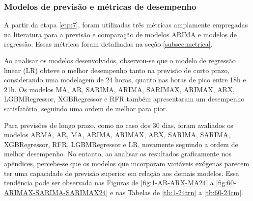 \subsubsection{Modelos de previs\~ao e m\'etricas de desempenho}\label{subsubsec:modelos}

A partir da etapa \ref{etp:7}, foram utilizadas três métricas amplamente empregadas na literatura para a previsão e comparação de modelos ARIMA e modelos de regressão. Essas métricas foram detalhadas na seção \ref{subsec:metrica}.

Ao analisar os modelos desenvolvidos, observou-se que o modelo de regressão linear (LR) obteve o melhor desempenho tanto na previsão de curto prazo, considerando uma modelagem de 24 horas, quanto nas horas de pico entre 18h e 21h. Os modelos MA, AR, SARIMA, ARIMA, SARIMAX, ARIMAX, ARX, LGBMRegressor, XGBRegressor e RFR também apresentaram um desempenho satisfatório, seguindo uma ordem de melhor para pior.

Para previsões de longo prazo, como no caso dos 30 dias, foram avaliados os modelos ARMA, AR, MA, ARIMA, ARIMAX, ARX, SARIMA, SARIMA, XGBRegressor, RFR, LGBMRegressor e LR, novamente seguindo a ordem de melhor desempenho. No entanto, ao analisar os resultados graficamente nos apêndices, percebe-se que os modelos que incorporam variáveis exógenas parecem ter uma capacidade de previsão superior em relação aos demais modelos. Essa tendência pode ser observada nas Figuras de \ref{fig:1-AR-ARX-MA24} a \ref{fig:60-ARIMAX-SARIMA-SARIMAX24} e nas Tabelas de \ref{tb:1-24trn} a \ref{tb:60-24cm}.  

